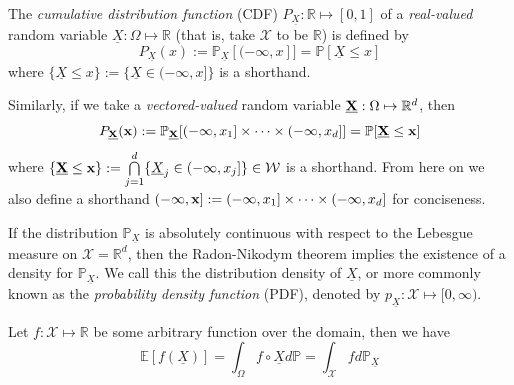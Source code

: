 \documentclass[twoside]{article} \usepackage{aistats2017}
\theoremstyle{definition}
\theoremstyle{remark}
\newcommand{\rv}[1]{\underline{#1}}
\begin{document}
		The \textit{cumulative distribution function} (CDF) $P_{\rv{X}} : \mathbb{R} \mapsto [0, 1]$ of a \textit{real-valued} random variable $\rv{X} : \Omega \mapsto \mathbb{R}$ (that is, take $\mathcal{X}$ to be $\mathbb{R}$) is defined by
		\begin{equation}
			P_{\rv{X}}(x) := \mathbb{P}_{\rv{X}}[(-\infty, x]] = \mathbb{P}[\rv{X} \leq x]
		\label{eq:cdf}
		\end{equation}
		where $\{\rv{X} \leq x\} := \{\rv{X} \in (-\infty, x]\}$ is a shorthand.

		Similarly, if we take a \textit{vectored-valued} random variable $\bvec{\rv{X}} : \Omega \mapsto \mathbb{R}^{d}$, then 
		\begin{equation}
			P_{\bvec{\rv{X}}}(\bvec{x}) := \mathbb{P}_{\bvec{\rv{X}}}[(-\infty, x_{1}] \times \dots \times (-\infty, x_{d}]] = \mathbb{P}[\bvec{\rv{X}} \leq \bvec{x}]
		\label{eq:cdf_vector}
		\end{equation}
		where $\{\bvec{\rv{X}} \leq \bvec{x}\} := \bigcap\limits_{j = 1}^{d} \{\rv{X}_{j} \in (-\infty, x_{j}]\} \in \mathcal{W}$ is a shorthand. From here on we also define a shorthand $(-\mathbf{\infty}, \mathbf{x}] := (-\infty, x_{1}] \times \dots \times (-\infty, x_{d}]$ for conciseness.
				
		
		If the distribution $\mathbb{P}_{\rv{X}}$ is absolutely continuous with respect to the Lebesgue measure on $\mathcal{X} = \mathbb{R}^{d}$, then the Radon-Nikodym theorem implies the existence of a density for $\mathbb{P}_{\rv{X}}$. We call this the distribution density of $\rv{X}$, or more commonly known as the \textit{probability density function} (PDF), denoted by $p_{\rv{X}}: \mathcal{X} \mapsto [0, \infty)$.
		
		Let $f : \mathcal{X} \mapsto \mathbb{R}$ be some arbitrary function over the domain, then we have
		\begin{equation}
			\mathbb{E}[f(\rv{X})] = \int_{\Omega} f \circ \rv{X} d \mathbb{P} = \int_{\mathcal{X}} f d \mathbb{P}_{\rv{X}}
		\label{eq:functional_expectation}
		\end{equation}
		
\end{document}
